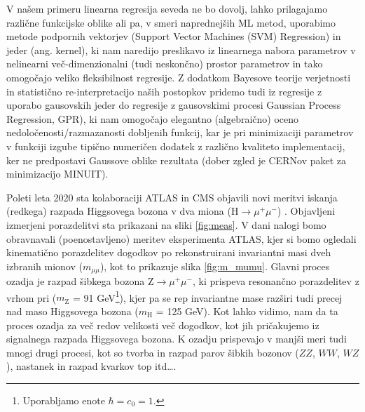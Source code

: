 \documentclass[slovene,11pt,a4paper]{article}
\begin{document}
V našem primeru linearna regresija seveda ne bo dovolj, lahko prilagajamo različne funkcijske oblike ali pa, v smeri naprednejših ML metod, uporabimo metode podpornih vektorjev (Support Vector Machines (SVM) Regression) in jeder (ang. kernel), ki nam naredijo preslikavo iz linearnega nabora parametrov v nelinearni več-dimenzionalni (tudi neskončno) prostor parametrov in tako omogočajo veliko fleksibilnost regresije. Z dodatkom Bayesove teorije verjetnosti in statistično re-interpretacijo naših postopkov pridemo tudi iz regresije z uporabo gausovskih jeder do regresije z gausovskimi procesi Gaussian Process Regression, GPR), ki nam omogočajo elegantno (algebraično) oceno nedoločenosti/razmazanosti dobljenih funkcij, kar je pri minimizaciji parametrov v funkciji izgube tipično numeričen dodatek z različno kvaliteto implementacij, ker ne predpostavi Gaussove oblike rezultata (dober zgled je CERNov paket za minimizacijo MINUIT).

Poleti leta 2020 sta kolaboraciji ATLAS in CMS objavili novi meritvi iskanja (redkega) razpada Higgsovega bozona v dva miona (H$\to \mu^+\mu^-$) \cite{atlas,cms}. Objavljeni izmerjeni porazdelitvi sta prikazani na sliki \ref{fig:meas}. V dani nalogi bomo obravnavali (poenostavljeno) meritev eksperimenta ATLAS, kjer si bomo ogledali kinematično porazdelitev dogodkov po rekonstruirani invariantni masi dveh izbranih mionov ($m_{\mu\mu}$), kot to prikazuje slika \ref{fig:m_mumu}. Glavni proces ozadja je razpad šibkega bozona Z$\to\mu^+\mu^-$, ki prispeva resonančno porazdelitev z vrhom pri ($m_\mathrm{Z}$ = 91 GeV\footnote{Uporabljamo enote $\hbar=c_0=1$.}), kjer pa se rep invariantne mase razširi tudi precej nad maso Higgsovega bozona ($m_\mathrm{H}$ = 125 GeV). Kot lahko vidimo, nam da ta proces ozadja za več redov velikosti več dogodkov, kot jih pričakujemo iz signalnega razpada Higgsovega bozona. K ozadju prispevajo v manjši meri tudi mnogi drugi procesi, kot so tvorba in razpad parov šibkih bozonov ($ZZ$, $WW$, $WZ$), nastanek in razpad kvarkov top itd\ldots. 
\end{document}
